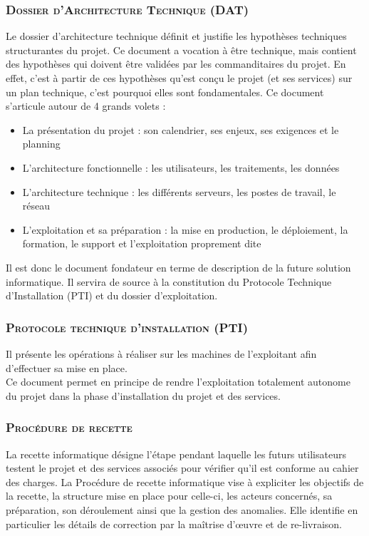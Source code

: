 \subsubsection{\textsc{Dossier d'Architecture Technique (DAT)}}
Le dossier d'architecture technique définit et justifie les hypothèses techniques structurantes du projet. Ce document a vocation à être technique, mais contient des hypothèses qui doivent être validées par les commanditaires du projet. En effet, c'est à partir de ces hypothèses qu'est conçu le projet (et ses services) sur un plan technique, c'est pourquoi elles sont fondamentales.
Ce document s'articule autour de 4 grands volets :
\begin{itemize}[label=\textbullet]
 \item La présentation du projet : son calendrier, ses enjeux, ses exigences et le planning
 \item L'architecture fonctionnelle : les utilisateurs, les traitements, les données 
 \item L'architecture technique : les différents serveurs, les postes de travail, le réseau
 \item L'exploitation et sa préparation : la mise en production, le déploiement, la formation, le support et l'exploitation proprement dite
\end{itemize}
Il est donc le document fondateur en terme de description de la future solution informatique. Il servira de source à la constitution du Protocole Technique d'Installation (PTI) et du dossier d'exploitation.

\subsubsection{\textsc{Protocole technique d'installation (PTI)}}
Il présente les opérations à réaliser sur les machines de l'exploitant afin d'effectuer sa mise en place.
\\
Ce document permet en principe de rendre l'exploitation totalement autonome du projet dans la phase d'installation du projet et des services.

\subsubsection{\textsc{Procédure de recette}}
La recette informatique désigne l'étape pendant laquelle les futurs utilisateurs testent le projet et des services associés pour vérifier qu'il est conforme au cahier des charges.
La Procédure de recette informatique vise à expliciter les objectifs de la recette, la structure mise en place pour celle-ci, les acteurs concernés, sa préparation, son déroulement ainsi que la gestion des anomalies. Elle identifie en particulier les détails de correction par la maîtrise d'œuvre et de re-livraison.

